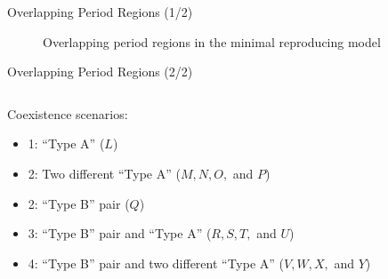 \begin{frame}{Overlapping Period Regions (1/2)}
    \vspace{-1.0em}
    \begin{figure}
        \centering
        \caption{Overlapping period regions in the minimal reproducing model}
    \end{figure}
\end{frame}

\begin{frame}{Overlapping Period Regions (2/2)}
    \begin{columns}
        \begin{column}{.5 \textwidth}
            Coexistence scenarios:
            \begin{itemize}
                \item 1: ``Type A'' ($L$)
                \item 2: Two different ``Type A'' ($M, N, O,$ and $P$)
                \item 2: ``Type B'' pair ($Q$)
                \item 3: ``Type B'' pair and ``Type A'' ($R, S, T,$ and $U$)
                \item 4: ``Type B'' pair and two different ``Type A'' ($V, W, X,$ and $Y$)
            \end{itemize}


\end{column}
\end{columns}
\end{frame}
